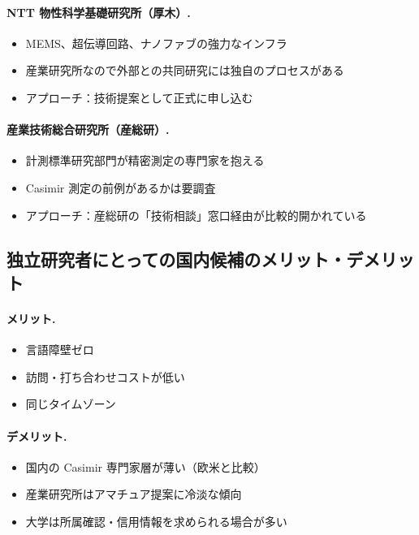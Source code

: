 \documentclass[11pt,a4paper]{article}
\begin{document}
\paragraph{NTT 物性科学基礎研究所（厚木）.}
\begin{itemize}
\item MEMS、超伝導回路、ナノファブの強力なインフラ
\item 産業研究所なので外部との共同研究には独自のプロセスがある
\item アプローチ：技術提案として正式に申し込む
\end{itemize}

\paragraph{産業技術総合研究所（産総研）.}
\begin{itemize}
\item 計測標準研究部門が精密測定の専門家を抱える
\item Casimir 測定の前例があるかは要調査
\item アプローチ：産総研の「技術相談」窓口経由が比較的開かれている
\end{itemize}

\subsection{独立研究者にとっての国内候補のメリット・デメリット}

\paragraph{メリット.}
\begin{itemize}
\item 言語障壁ゼロ
\item 訪問・打ち合わせコストが低い
\item 同じタイムゾーン
\end{itemize}

\paragraph{デメリット.}
\begin{itemize}
\item 国内の Casimir 専門家層が薄い（欧米と比較）
\item 産業研究所はアマチュア提案に冷淡な傾向
\item 大学は所属確認・信用情報を求められる場合が多い
\end{itemize}
\end{document}
